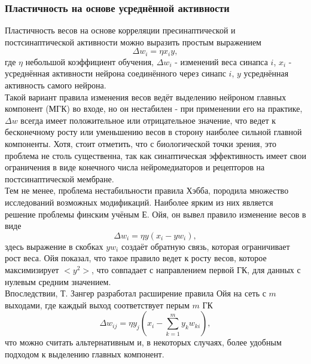 \documentclass[a4paper,10pt]{article}
\begin{document}
\subsubsection{Пластичность на основе усреднённой активности}
\indent Пластичность весов на основе корреляции пресинаптической и постсинаптической активности можно выразить простым выражением
\begin{equation}
\Delta w_{i} = \eta x_{i}y,
\end{equation}
где $\eta$ небольшой коэффициент обучения, $\Delta w_{i}$ - изменений веса синапса $i$, $x_{i}$ - усреднённая активности нейрона соединённого через синапс $i$, $y$ усреднённая активность самого нейрона.\\
\indent Такой вариант правила изменения весов ведёт выделению нейроном главных компонент (МГК) во входе, но он нестабилен - при применении его на практике, $\Delta w$ всегда имеет положительное или отрицательное значение, что ведет к бесконечному росту или уменьшению весов в сторону наиболее сильной главной компоненты. Хотя, стоит отметить, что с биологической точки зрения, это проблема не столь существенна, так как синаптическая эффективность имеет свои ограничения в виде конечного числа нейромедиаторов и рецепторов на постсинаптической мембране\cite{NeuralAndAdaptiveSystems}.\\
\indent Тем не менее, проблема нестабильности правила Хэбба, породила множество исследований возможных модификаций. Наиболее ярким из них является решение проблемы финским учёным Е. Ойя, он вывел правило изменение весов в виде
\begin{equation}
\Delta w_{i} = \eta y (x_{i} - yw_{i}),
\end{equation}
здесь выражение в скобках $yw_{i}$ создаёт обратную связь, которая ограничивает рост веса. Ойя показал, что такое правило ведет к росту весов, которое максимизирует $<y^2>$, что совпадает с направлением первой ГК, для данных с нулевым средним значением.\\
\indent Впоследствии, Т. Зангер разработал расширение правила Ойя на сеть с $m$ выходами, где каждый выход соответствует перым $m$ ГК
\begin{equation}
\Delta w_{ij} = \eta y_{j} (x_{i} - \sum_{k=1}^{m}y_{k}w_{ki}),
\end{equation}
что можно считать альтернативным и, в некоторых случаях, более удобным подходом к выделению главных компонент.
\end{document}
